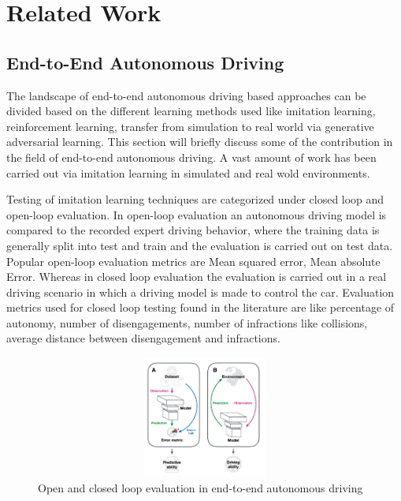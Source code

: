 

    \chapter{Related Work}


    \section{End-to-End Autonomous Driving}
    The landscape of end-to-end autonomous driving based approaches can be divided based on the different learning methods used like imitation learning, reinforcement learning, transfer from simulation to real world via generative adversarial learning.
This section will briefly discuss some of the contribution in the field of end-to-end autonomous driving. A vast amount of work has been carried out via imitation learning in simulated and real wold environments. 
\par Testing of imitation learning techniques are categorized under closed loop and open-loop evaluation. In open-loop evaluation an autonomous driving model is compared to the recorded expert driving behavior, where the training data is generally split into test and train and the evaluation is carried out on test data. Popular open-loop evaluation metrics are Mean squared error, Mean absolute Error. Whereas in closed loop evaluation the evaluation is carried out in a real driving scenario in which a driving model is made to control the car. Evaluation metrics used for closed loop testing found in the literature are like percentage of autonomy, number of disengagements, number of infractions like collisions, average distance between disengagement and infractions.

 \begin{figure}[h]
    \centering
    \includegraphics[width=12cm, height=4cm]{images/open_closed.png}
    \caption{Open and closed loop evaluation in end-to-end autonomous driving \cite{DBLP:journals/corr/abs-2003-06404}}
    \end{figure}

